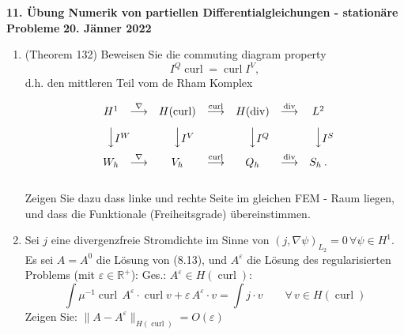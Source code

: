 \documentclass[11pt,a4paper]{report}
\newcommand{\setR}{\mathbb{R}}
\newcommand{\opdiv}{\operatorname{div}}
\newcommand{\opcurl}{\operatorname{curl}}
\newcommand{\eps}{\varepsilon}
\begin{document}
\begin{center}
\textbf{11. \"Ubung Numerik von partiellen Differentialgleichungen - station\"are Probleme} \newline 
\textbf{20. J\"anner 2022}
\end{center}

\setcounter{enumi}{4}

\begin{enumerate}
\item (Theorem 132) Beweisen Sie die commuting diagram property
  $$
  I^Q \opcurl = \opcurl I^V,
  $$
  d.h. den mittleren Teil vom de Rham Komplex
  
\begin{equation}
\begin{array}{ccccccc}
H^1             &      \stackrel{\nabla}{\longrightarrow}          &
H(\opcurl)      &      \stackrel{\opcurl}{\longrightarrow}   &
H(\opdiv)       &      \stackrel{\opdiv}{\longrightarrow}    & 
L^2                                                                                    \\[8pt]
\Big\downarrow  \vcenter{ \rlap{$I^W$}}  &                  &
\Big\downarrow  \vcenter{ \rlap{$I^V$}}  &                  &
\Big\downarrow  \vcenter{ \rlap{$I^Q$}}  &                  &
\Big\downarrow  \vcenter{ \rlap{$I^S$}}                             \\[8pt]
 W_h                   &      
\stackrel{\nabla}{\longrightarrow}          &
 V_h       &     
 \stackrel{\opcurl}{\longrightarrow}   &
 Q_h          &      
\stackrel{\opdiv}{\longrightarrow}    & 
S_h  \:.                                                                               \\[8pt]
\end{array}
\label{equ_derham}
\end{equation}

  
Zeigen Sie dazu dass linke und rechte Seite im gleichen FEM - Raum
liegen, und dass die Funktionale (Freiheitsgrade) \"ubereinstimmen.
  

\item Sei $j$ eine divergenzfreie Stromdichte im Sinne von $(j, \nabla \psi)
  _{L_2}=0  \,\forall \psi \in H^1$. Es sei $A = A^0$ die L\"osung
  von (8.13), und $A^\eps$ die L\"osung des regularisierten Problems
  (mit $\eps \in \setR^+$): 
Ges.: $A^\eps \in H(\opcurl)$: 
$$
\int \mu^{-1} \opcurl \, A^\eps \cdot \opcurl v + \eps \, A^\eps \cdot v = \int
j \cdot v \qquad \forall \, v \in H(\opcurl)
$$
Zeigen Sie: $\| A - A^\eps \|_{H(\opcurl)} = O(\eps)$
 

\end{enumerate}
\end{document}
